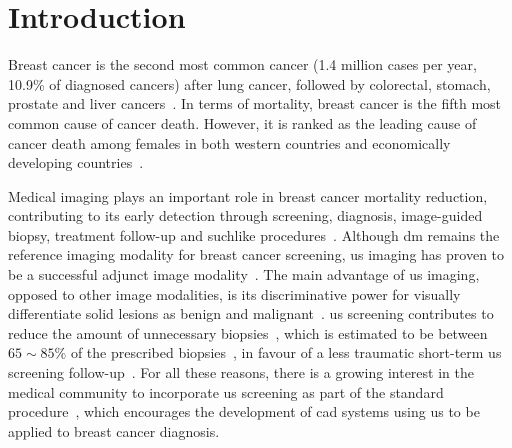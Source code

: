 \graphicspath{ {./content/intro/figures/} }

\section{Introduction}
\label{sec:intro}  %


Breast cancer is the second most common cancer (1.4 million cases per year, 10.9\% of  diagnosed cancers) after lung cancer, followed by colorectal, stomach, prostate and liver cancers~\cite{Ferlay2010}.
In terms of mortality, breast cancer is the fifth most common cause of cancer death.
However, it is ranked as the leading cause of cancer death among females in both western countries and economically developing countries~\cite{cancerStatistics2011}.

Medical imaging plays an important role in breast cancer mortality reduction, contributing to its early detection through screening, diagnosis, image-guided biopsy, treatment follow-up and suchlike procedures~\cite{smith2003american}.
Although \ac{dm} remains the reference imaging modality for breast cancer screening, \ac{us} imaging has proven to be a successful adjunct image modality~\cite{smith2003american,berg2004diagnostic}.
The main advantage of \ac{us} imaging, opposed to other image modalities, is its discriminative power for visually differentiate solid lesions as benign and malignant~\cite{Stavros:1995p12392}.
\Ac{us} screening contributes to reduce the amount of unnecessary biopsies~\cite{ciatto1994contribution}, which is estimated to be between $65\sim85\%$ of the prescribed biopsies~\cite{yuan2010multimodality}, in favour of a less traumatic short-term \ac{us} screening follow-up~\cite{gordon1995malignant}.
For all these reasons, there is a growing interest in the medical community to incorporate \ac{us} screening as part of the standard procedure~\cite{biradsus}, which encourages the development of \ac{cad} systems using \ac{us} to be applied to breast cancer diagnosis.


